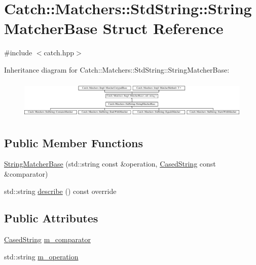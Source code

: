 \hypertarget{struct_catch_1_1_matchers_1_1_std_string_1_1_string_matcher_base}{}\section{Catch\+::Matchers\+::Std\+String\+::String\+Matcher\+Base Struct Reference}
\label{struct_catch_1_1_matchers_1_1_std_string_1_1_string_matcher_base}


{\ttfamily \#include $<$catch.\+hpp$>$}

Inheritance diagram for Catch\+::Matchers\+::Std\+String\+::String\+Matcher\+Base\+:\begin{figure}[H]
\begin{center}
\leavevmode
\includegraphics[height=1.879195cm]{struct_catch_1_1_matchers_1_1_std_string_1_1_string_matcher_base}
\end{center}
\end{figure}
\subsection*{Public Member Functions}
\begin{DoxyCompactItemize}
\item 
\mbox{\hyperlink{struct_catch_1_1_matchers_1_1_std_string_1_1_string_matcher_base_a3a9b66bae298ae27058478529b4bb39d}{String\+Matcher\+Base}} (std\+::string const \&operation, \mbox{\hyperlink{struct_catch_1_1_matchers_1_1_std_string_1_1_cased_string}{Cased\+String}} const \&comparator)
\item 
std\+::string \mbox{\hyperlink{struct_catch_1_1_matchers_1_1_std_string_1_1_string_matcher_base_a47af030f8cea42a601ffb1000eea5cca}{describe}} () const override
\end{DoxyCompactItemize}
\subsection*{Public Attributes}
\begin{DoxyCompactItemize}
\item 
\mbox{\hyperlink{struct_catch_1_1_matchers_1_1_std_string_1_1_cased_string}{Cased\+String}} \mbox{\hyperlink{struct_catch_1_1_matchers_1_1_std_string_1_1_string_matcher_base_a17c9f0fe40587070ffe998c193742831}{m\+\_\+comparator}}
\item 
std\+::string \mbox{\hyperlink{struct_catch_1_1_matchers_1_1_std_string_1_1_string_matcher_base_a7a25c4b7d863e9a1c406d81efd0f83ca}{m\+\_\+operation}}
\end{DoxyCompactItemize}
